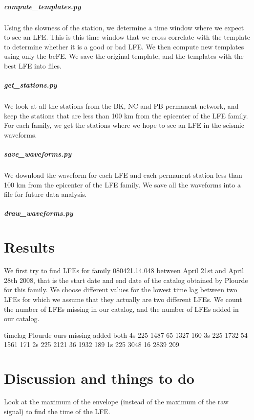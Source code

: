 \documentclass[main.tex]{subfiles}
\begin{document}
\paragraph{compute\_templates.py} Using the slowness of the station, we determine a time window where we expect to see an LFE. This is this time window that we cross correlate with the template to determine whether it is a good or bad LFE. We then compute new templates using only the beFE. We save the original template, and the templates with the best LFE into files.

\paragraph{get\_stations.py} We look at all the stations from the BK, NC and PB permanent network, and keep the stations that are less than 100 km from the epicenter of the LFE family. For each family, we get the stations where we hope to see an LFE in the seismic waveforms.

\paragraph{save\_waveforms.py} We download the waveform for each LFE and each permanent station less than 100 km from the epicenter of the LFE family. We save all the waveforms into a file for future data analysis.

\paragraph{draw\_waveforms.py}

\chapter{Results}

We first try to find LFEs for family 080421.14.048 between April 21st and April 28th 2008, that is the start date and end date of the catalog obtained by Plourde for this family. We choose different values for the lowest time lag between two LFEs for which we assume that they actually are two different LFEs. We count the number of LFEs missing in our catalog, and the number of LFEs added in our catalog.

timelag Plourde ours missing added both
4s 225 1487 65 1327 160
3s 225 1732 54 1561 171
2s 225 2121 36 1932 189
1s 225 3048 16 2839 209

\chapter{Discussion and things to do}

Look at the maximum of the envelope (instead of the maximum of the raw signal) to find the time of the LFE.
\end{document}
